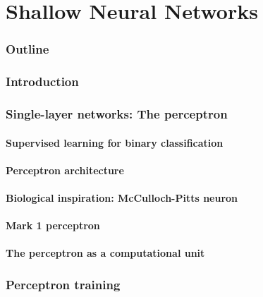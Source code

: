 \renewcommand{\thispart}{2 }
\renewcommand{\thispartname}{Shallow Neural Networks}

\part{\thispartname}



\section{Outline}


\section{Introduction}



\section{Single-layer networks: The perceptron}
\subsection{Supervised learning for binary classification}

\subsection{Perceptron architecture}

\subsection{Biological inspiration: McCulloch-Pitts neuron}

\subsection{Mark 1 perceptron}

\subsection{The perceptron as a computational unit}


\section{Perceptron training}


